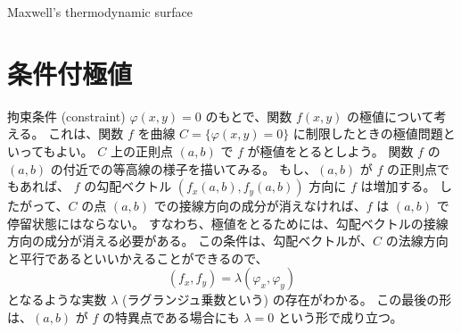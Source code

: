 \documentclass[a4paper]{jsarticle}
\theoremstyle{definition}
\theoremstyle{remark}
\begin{document}



Maxwell's thermodynamic surface

\bigskip
\section{条件付極値}
拘束条件 (constraint) $\varphi(x,y) = 0$ のもとで、関数 $f(x,y)$ の極値について考える。
これは、関数 $f$ を曲線 $C = \{ \varphi(x,y) = 0 \}$ に制限したときの極値問題といってもよい。
$C$ 上の正則点 $(a,b)$ で $f$ が極値をとるとしよう。
関数 $f$ の $(a,b)$ の付近での等高線の様子を描いてみる。
もし、$(a,b)$ が $f$ の正則点でもあれば、
$f$ の勾配ベクトル $(f_x(a,b),f_y(a,b))$ 方向に $f$ は増加する。
したがって、$C$ の点 $(a,b)$ での接線方向の成分が消えなければ、$f$ は $(a,b)$ で停留状態にはならない。
すなわち、極値をとるためには、勾配ベクトルの接線方向の成分が消える必要がある。
この条件は、勾配ベクトルが、$C$ の法線方向と平行であるといいかえることができるので、
\[
(f_x,f_y) = \lambda (\varphi_x,\varphi_y)
\]
となるような実数 $\lambda$ (ラグランジュ乗数という) の存在がわかる。
この最後の形は、$(a,b)$ が $f$ の特異点である場合にも $\lambda = 0$ という形で成り立つ。
\end{document}
